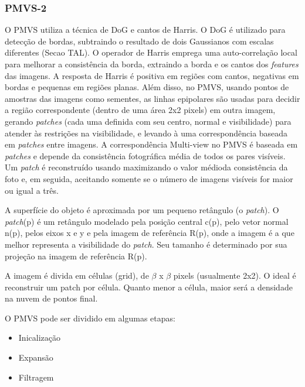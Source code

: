 \begin{itemize}
\subsubsection{PMVS-2}

O PMVS utiliza a técnica de DoG e cantos de Harris. O DoG é utilizado para detecção de bordas, subtraindo o resultado de dois Gaussianos com escalas diferentes (Secao TAL). O operador de Harris emprega uma auto-correlação local para melhorar a consistência da borda, extraindo a borda e os cantos dos {\it features} das imagens. A resposta de Harris é positiva em regiões com cantos, negativas em bordas e pequenas em regiões planas. Além disso, no PMVS, usando pontos de amostras das imagens como sementes, as linhas epipolares são usadas para decidir a região correspondente (dentro de uma área 2x2 pixels) em outra imagem, gerando {\it patches} (cada uma definida com seu centro, normal e visibilidade) para atender às restrições na visibilidade, e levando à uma correspondência baseada em {\it patches} entre imagens. A correspondência Multi-view no PMVS é baseada em {\it patches} e depende da consistência fotográfica média de todos os pares visíveis. Um {\it patch} é reconstruído usando maximizando o valor médioda consistência da foto e, em seguida, aceitando somente se o número de imagens visíveis for maior ou igual a três.  



A superfície do objeto é aproximada por um pequeno retângulo (o {\it patch}).
O {\it patch}(p) é um retângulo modelado pela posição central c(p), pelo vetor normal n(p), pelos eixos x e y e pela imagem de referência R(p), onde a imagem é a que melhor representa a visibilidade do {\it patch}. Seu tamanho é determinado por sua projeção na imagem de referência R(p).

A imagem é divida em células (grid), de $\beta$ x $\beta$ pixels (usualmente 2x2). O ideal é reconstruir um patch por célula. Quanto menor a célula, maior será a densidade na nuvem de pontos final.

O PMVS pode ser dividido em algumas etapas:

\begin{itemize}
\item{Inicalização}
\item{Expansão}
\item{Filtragem}
\end{itemize}


\end{itemize}
